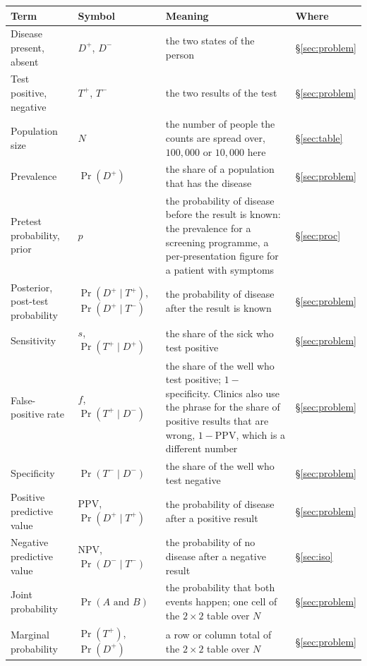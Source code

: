 \documentclass[11pt]{article}
\begin{document}
{\footnotesize
\renewcommand{\arraystretch}{1.2}
\begin{longtable}{P{0.19\textwidth}|P{0.2\textwidth}|P{0.42\textwidth}|P{0.07\textwidth}}
\toprule
\textbf{Term} & \textbf{Symbol} & \textbf{Meaning} & \textbf{Where} \\
\midrule
\endhead
Disease present, absent & $D^+$, $D^-$ & the two states of the person & \S\ref{sec:problem} \\
Test positive, negative & $T^+$, $T^-$ & the two results of the test & \S\ref{sec:problem} \\
Population size & $N$ & the number of people the counts are spread over, $100{,}000$ or $10{,}000$ here & \S\ref{sec:table} \\
Prevalence & $\Pr(D^+)$ & the share of a population that has the disease & \S\ref{sec:problem} \\
Pretest probability, prior & $p$ & the probability of disease before the result is known: the prevalence for a screening programme, a per-presentation figure for a patient with symptoms & \S\ref{sec:proc} \\
Posterior, post-test probability & $\Pr(D^+ \mid T^+)$, $\Pr(D^+ \mid T^-)$ & the probability of disease after the result is known & \S\ref{sec:problem} \\
Sensitivity & $s$, $\Pr(T^+ \mid D^+)$ & the share of the sick who test positive & \S\ref{sec:problem} \\
False-positive rate & $f$, $\Pr(T^+ \mid D^-)$ & the share of the well who test positive; $1 - {}$specificity. Clinics also use the phrase for the share of positive results that are wrong, $1 - {}$PPV, which is a different number & \S\ref{sec:problem} \\
Specificity & $\Pr(T^- \mid D^-)$ & the share of the well who test negative & \S\ref{sec:problem} \\
Positive predictive value & PPV, $\Pr(D^+ \mid T^+)$ & the probability of disease after a positive result & \S\ref{sec:problem} \\
Negative predictive value & NPV, $\Pr(D^- \mid T^-)$ & the probability of no disease after a negative result & \S\ref{sec:iso} \\
Joint probability & $\Pr(A \text{ and } B)$ & the probability that both events happen; one cell of the $2\times 2$ table over $N$ & \S\ref{sec:problem} \\
Marginal probability & $\Pr(T^+)$, $\Pr(D^+)$ & a row or column total of the $2\times 2$ table over $N$ & \S\ref{sec:problem} \\

\end{longtable}}
\end{document}
